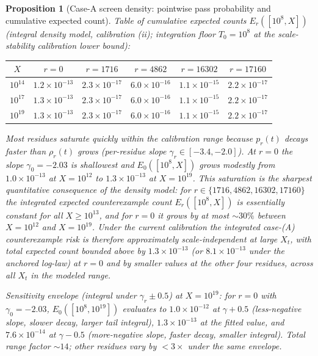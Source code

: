 \documentclass[11pt]{article}
\renewcommand{\_}{\origunderscore\allowbreak}
\newtheorem{proposition}[theorem]{Proposition}
\theoremstyle{definition}
\theoremstyle{remark}
\begin{document}
\begin{proposition}[Case-A screen density: pointwise pass probability and cumulative expected count]
\noindent\emph{Table of cumulative expected counts $E_r([10^8, X])$}
(integral density model, calibration (ii); integration floor
$T_0 = 10^8$ at the scale-stability calibration lower bound):

\begin{center}
\begin{tabular}{c|ccccc}
\hline
$X$ & $r=0$ & $r=1716$ & $r=4862$ & $r=16302$ & $r=17160$ \\
\hline
$10^{14}$ & $1.2\times 10^{-13}$ & $2.3\times 10^{-17}$ & $6.0\times 10^{-16}$ & $1.1\times 10^{-15}$ & $2.2\times 10^{-17}$ \\
$10^{17}$ & $1.3\times 10^{-13}$ & $2.3\times 10^{-17}$ & $6.0\times 10^{-16}$ & $1.1\times 10^{-15}$ & $2.2\times 10^{-17}$ \\
$10^{19}$ & $1.3\times 10^{-13}$ & $2.3\times 10^{-17}$ & $6.0\times 10^{-16}$ & $1.1\times 10^{-15}$ & $2.2\times 10^{-17}$ \\
\hline
\end{tabular}
\end{center}

\noindent Most residues saturate quickly within the calibration range
because $p_r(t)$ decays faster than $\rho_r(t)$ grows (per-residue
slope $\gamma_r\in[-3.4,-2.0]$). At $r=0$ the slope $\gamma_0 = -2.03$
is shallowest and $E_0([10^8,X])$ grows modestly from
$1.0\times 10^{-13}$ at $X=10^{12}$ to $1.3\times 10^{-13}$ at
$X=10^{19}$.  This saturation is the sharpest quantitative
consequence of the density model: for $r\in\{1716, 4862, 16302,
17160\}$ the integrated expected counterexample count
$E_r([10^8, X])$ is essentially constant for all $X\ge 10^{13}$,
and for $r=0$ it grows by at most $\sim 30\%$ between $X=10^{12}$
and $X=10^{19}$.  Under the current calibration the integrated
case-(A) counterexample risk is therefore approximately
scale-independent at large $X_t$, with total expected count bounded
above by $1.3\times 10^{-13}$ (or $8.1\times 10^{-13}$ under the
anchored log-law) at $r=0$ and by smaller values at the other four
residues, across all $X_t$ in the modeled range.

\emph{Sensitivity envelope} (integral under $\gamma_r\pm 0.5$) at
$X=10^{19}$: for $r=0$ with $\gamma_0=-2.03$,
$E_0([10^8, 10^{19}])$ evaluates to $1.0\times 10^{-12}$ at
$\gamma+0.5$ (less-negative slope, slower decay, larger tail
integral), $1.3\times 10^{-13}$ at the fitted value, and
$7.6\times 10^{-14}$ at $\gamma-0.5$ (more-negative slope, faster
decay, smaller integral).  Total range factor $\sim 14$; other
residues vary by $<3\times$ under the same envelope.


\end{proposition}
\end{document}
